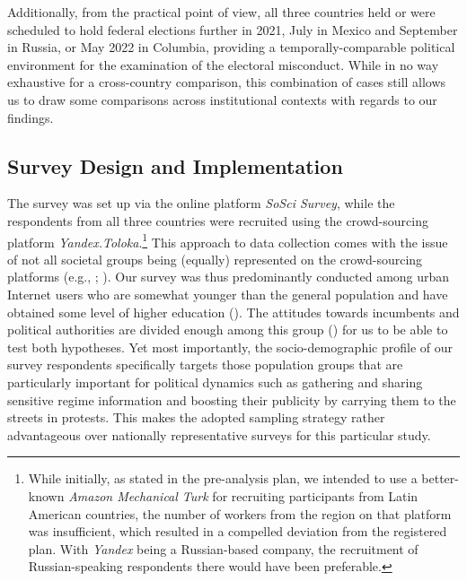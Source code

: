 \documentclass[11pt, ngerman,english,a4]{article}
\begin{document}
Additionally, from the practical point of view, all three countries held or were scheduled to hold federal elections further in 2021, July in Mexico and September in Russia, or May 2022 in Columbia, providing a temporally-comparable political environment for the examination of the electoral misconduct. While in no way exhaustive for a cross-country comparison, this combination of cases still allows us to draw some comparisons across institutional contexts with regards to our findings. 


\subsection*{Survey Design and Implementation}
The survey was set up via the online platform \textit{SoSci Survey}, while the respondents from all three countries were recruited using the crowd-sourcing platform \textit{Yandex.Toloka}.\footnote{
While initially, as stated in the pre-analysis plan, we intended to use a better-known \textit{Amazon Mechanical Turk} for recruiting participants from Latin American countries, the number of workers from the region on that platform was insufficient, which resulted in a compelled deviation from the registered plan. 
With \textit{Yandex} being a Russian-based company, the recruitment of Russian-speaking respondents there would have been preferable.} 
This approach to data collection comes with the issue of not all societal groups being (equally) represented on the crowd-sourcing platforms (e.g., \citealt{Bartneck2015}; \citealt{Berinsky2012}). 
Our survey was thus predominantly conducted among urban Internet users who are somewhat younger than the general population and have obtained some level of higher education (\citealt{Berinsky2012}). 
The attitudes towards incumbents and political authorities are divided enough among this group (\citealt{Robertson2017}) for us to be able to test both hypotheses. 
Yet most importantly, the socio-demographic profile of our survey respondents specifically targets those population groups that are particularly important for political dynamics such as gathering and sharing sensitive regime information and boosting their publicity by carrying them to the streets in protests.
This makes the adopted sampling strategy rather advantageous over nationally representative surveys for this particular study. 
\end{document}
